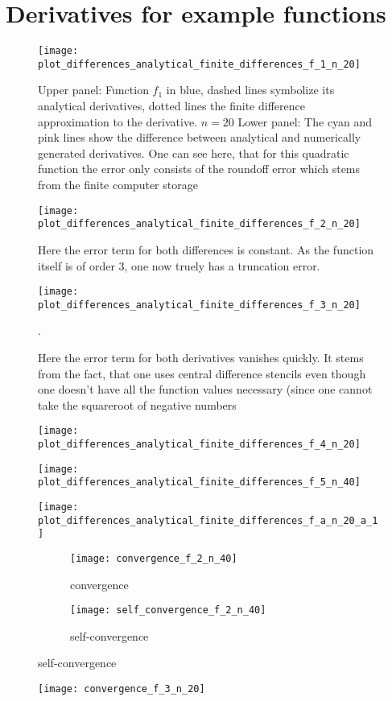 \section{Derivatives for example functions}

\begin{figure}[h]
		\texttt{[image: plot\_differences\_analytical\_finite\_differences\_f\_1\_n\_20]}
		\caption{Upper panel: Function $f_1$ in blue, dashed lines symbolize its analytical derivatives, dotted lines the finite difference approximation to the derivative. $n= 20$  Lower panel: The cyan and pink lines show the difference between analytical and numerically generated derivatives.
		One can see here, that for this quadratic function the error only consists of the roundoff error which stems from the finite computer storage}
\end{figure}

\begin{figure}
		\texttt{[image: plot\_differences\_analytical\_finite\_differences\_f\_2\_n\_20]}
		\caption{ Here the error term for both differences is constant. As the function itself is of order 3, one now truely has a truncation error.}
\end{figure}

\begin{figure}
		\texttt{[image: plot\_differences\_analytical\_finite\_differences\_f\_3\_n\_20]}
	\caption{Here the error term for both derivatives vanishes quickly. It stems from the fact, that one uses central difference stencils even though one doesn't have all the function values necessary (since one cannot take the squareroot of negative numbers}.
\end{figure}

\begin{figure}
		\texttt{[image: plot\_differences\_analytical\_finite\_differences\_f\_4\_n\_20]}
		\caption{}
\end{figure}


\begin{figure}
		\texttt{[image: plot\_differences\_analytical\_finite\_differences\_f\_5\_n\_40]}
		\caption{}
\end{figure}


\begin{figure}
		\texttt{[image: plot\_differences\_analytical\_finite\_differences\_f\_a\_n\_20\_a\_1]}
		\caption{}
\end{figure}

\begin{figure}
	\centering
	\begin{subfigure}[b]{\textwidth}
		\texttt{[image: convergence\_f\_2\_n\_40]}
		\caption{convergence}
	\end{subfigure}
	\hfill 
	\begin{subfigure}[b]{\textwidth}
		\texttt{[image: self\_convergence\_f\_2\_n\_40]}
		\caption{self-convergence}
	\end{subfigure}
\end{figure}
\begin{figure}
		\texttt{[image: convergence\_f\_3\_n\_20]}
		\caption{ }
\end{figure}

